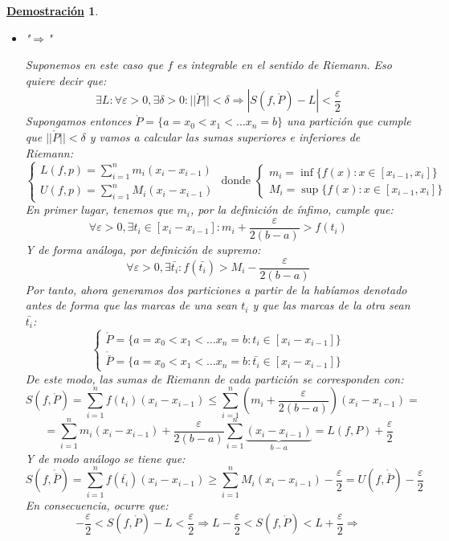 \documentclass[10pt,a4paper,openright]{book}
\theoremstyle{break}
\newtheorem*{demo}{\underline{Demostración}}
\begin{document}
\begin{demo}
\begin{itemize}
\item "$\Rightarrow$"

Suponemos en este caso que $f$ es integrable en el sentido de Riemann. Eso quiere decir que:
$$\exists L: \forall \varepsilon > 0, \exists \delta > 0 : ||\mathring{P}|| < \delta \Rightarrow |S(f, \mathring{P}) - L| < \frac{\varepsilon}{2}$$
Supongamos entonces $\mathring{P}= \{ a = x_0 < x_1 < \ldots  x_n = b\}$ una partición que cumple que $||\mathring{P}||<\delta$ y vamos a calcular las sumas superiores e inferiores de Riemann:
$$\begin{cases} L(f, p) = \displaystyle \sum_{i=1}^{n} m_i (x_i - x_{i-1})  \\ U(f, p) = \displaystyle \sum_{i=1}^{n} M_i (x_i - x_{i-1}) \end{cases} \mbox{ donde }	\begin{cases} m_i = \inf \{f(x): x\in [x_{i-1}, x_i]\} \\ M_i = \sup \{f(x): x\in [x_{i-1}, x_i]\} \end{cases}$$
En primer lugar, tenemos que $m_i$, por la definición de ínfimo, cumple que:
$$\forall \varepsilon > 0, \exists t_i \in [x_i - x_{i-1}]: m_i + \frac{\varepsilon}{2(b-a)} > f(t_i)$$
Y de forma análoga, por definición de supremo:
$$\forall \varepsilon > 0, \exists \bar{t_i}: f(\bar{t_i}) > M_i - \frac{\varepsilon}{2(b-a)}$$
Por tanto, ahora generamos dos particiones a partir de la habíamos denotado antes de forma que las marcas de una sean $t_i$ y que las marcas de la otra sean $\bar{t_i}$:
$$\begin{cases} \mathring{P} =\{ a = x_0 < x_1 < \ldots  x_n = b : t_i \in [x_i - x_{i-1}] \} \\ \mathring{\bar{P}} =\{ a = x_0 < x_1 < \ldots  x_n = b : \bar{t_i} \in [x_i - x_{i-1}] \} \end{cases}$$
De este modo, las sumas de Riemann de cada partición se corresponden con:
$$ S(f, \mathring{P}) = \sum_{i=1}^{n} f(t_i) (x_i - x_{i-1}) \leq \sum_{i=1}^{n} \left(m_i + \frac{\varepsilon}{2(b-a)}\right) (x_i - x_{i-1}) =$$
$$= \sum_{i=1}^{n} m_i (x_i - x_{i-1}) + \frac{\varepsilon}{2(b-a)} \sum_{i=1}^{n} \underbrace{(x_i - x_{i-1})}_{b-a} = L(f, P) + \frac{\varepsilon}{2}$$
Y de modo análogo se tiene que:
$$ S(f, \mathring{\bar{P}}) = \sum_{i=1}^{n} f(\bar{t_i}) (x_i - x_{i-1}) \geq \sum_{i=1}^{n} M_i (x_i - x_{i-1}) - \frac{\varepsilon}{2} = U(f,\mathring{\bar{P}})- \frac{\varepsilon}{2}$$
En consecuencia, ocurre que:
$$-\frac{\varepsilon}{2} < S(f, \mathring{P}) - L < \frac{\varepsilon}{2} \Rightarrow L-\frac{\varepsilon}{2} < S(f, \mathring{P}) < L+\frac{\varepsilon}{2} \Rightarrow $$

\end{itemize}
\end{demo}
\end{document}
